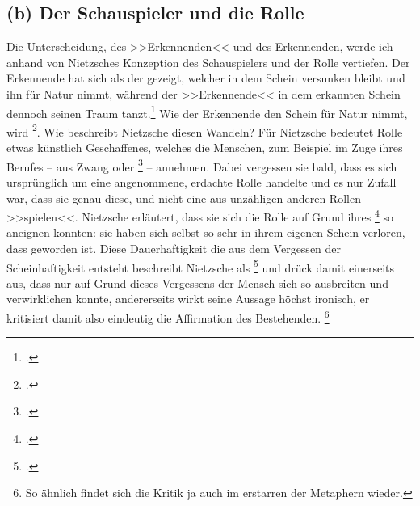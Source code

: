 \documentclass[12pt, a4paper, openany]{report}
\begin{document}
\subsection{(b) Der Schauspieler und die Rolle}
Die Unterscheidung, des >>Erkennenden<< und des Erkennenden, werde ich anhand von Nietzsches Konzeption des Schauspielers und der Rolle vertiefen. 
Der Erkennende hat sich als der gezeigt, welcher in dem Schein versunken bleibt und ihn für Natur nimmt, während der >>Erkennende<< in dem erkannten Schein dennoch seinen Traum tanzt.\footcite[Vgl.][417]{nietzsche_morgenrote_1999}
Wie der Erkennende den Schein für Natur nimmt, wird \footcite[][595]{nietzsche_morgenrote_1999}.
Wie beschreibt Nietzsche diesen Wandeln?
Für Nietzsche bedeutet Rolle etwas künstlich Geschaffenes, welches die Menschen, zum Beispiel im Zuge ihres Berufes -- aus Zwang oder \footcite[][595]{nietzsche_morgenrote_1999} -- annehmen. 
Dabei vergessen sie bald, dass es sich ursprünglich um eine angenommene, erdachte Rolle handelte und es nur Zufall war, dass sie genau diese, und nicht eine aus unzähligen anderen Rollen >>spielen<<.
Nietzsche erläutert, dass sie sich die Rolle auf Grund ihres \footcite[][595]{nietzsche_morgenrote_1999} so aneignen konnten:
sie haben sich selbst so sehr in ihrem eigenen Schein verloren, dass  geworden ist. 
Diese Dauerhaftigkeit die aus dem Vergessen der Scheinhaftigkeit entsteht beschreibt Nietzsche als \footcite[][595]{nietzsche_morgenrote_1999} und drück damit einerseits aus, dass nur auf Grund dieses Vergessens der Mensch sich so ausbreiten und verwirklichen konnte, andererseits wirkt seine Aussage höchst ironisch, er kritisiert damit also eindeutig die Affirmation des Bestehenden.%
\footnote{
    So ähnlich findet sich die Kritik ja auch im erstarren der Metaphern wieder.
}\\ 
\end{document}
